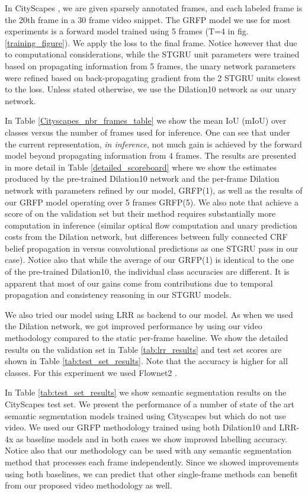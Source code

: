 \documentclass[10pt,twocolumn,letterpaper]{article}
\begin{document}
In CityScapes \cite{cordts2016cityscapes}, we are given sparsely annotated frames, and each labeled frame is the 20th frame in a 30 frame video snippet. The GRFP model we use for most experiments is a forward model trained using 5 frames (T=4 in fig. \ref{training_figure}). We apply the loss to the final frame. Notice however that due to computational considerations, while the STGRU unit parameters  were trained based on propagating information from 5 frames, the unary network parameters  were refined based on back-propagating gradient from the 2 STGRU units closest to the loss. Unless stated otherwise, we use the Dilation10 \cite{yu2015multi} network as our unary network.  


In Table \ref{Cityscapes_nbr_frames_table} we show the mean IoU (mIoU) over classes versus the number of frames used for inference. One can see that under the current representation, \emph{in inference}, not much gain is achieved by the forward model beyond propagating information from 4 frames. The results are presented in more detail in Table \ref{detailed_scoreboard} where we show the estimates produced by the pre-trained Dilation10 network and the per-frame Dilation network with parameters refined by our model, GRFP(1), as well as the results of our GRFP model operating over 5 frames GRFP(5). We also note that \cite{kundu2016feature} achieve a score of  on the validation set but their method requires substantially more computation in inference (similar optical flow computation and unary prediction costs from the Dilation network, but differences between fully connected CRF belief propagation in \cite{kundu2016feature} versus convolutional predictions as one STGRU pass in our case). Notice also that while the average of our GRFP(1) is identical to the one of the pre-trained Dilation10, the individual class accuracies are different. It is apparent that most of our gains come from contributions due to temporal propagation and consistency reasoning in our STGRU models.

We also tried our model using LRR \cite{lrr4x} as backend to our model. As when we used the Dilation network, we got improved performance by using our video methodology compared to the static per-frame baseline. We show the detailed results on the validation set in Table \ref{tab:lrr_results} and test set scores are shown in Table \ref{tab:test_set_results}. Note that the accuracy is higher for all classes. For this experiment we used Flownet2 \cite{flownet2}.

In Table \ref{tab:test_set_results} we show semantic segmentation results on the CityScapes test set. We present the performance of a number of state of the art semantic segmentation models trained using Cityscapes but which do not use video. 
We used our GRFP methodology trained using both Dilation10 and LRR-4x as baseline models and in both cases we show  improved labelling accuracy. Notice also that our methodology can be used with any semantic segmentation method that processes each frame independently. Since we showed improvements using both baselines, we can predict that other single-frame methods can benefit from our proposed video methodology as well.
\end{document}
